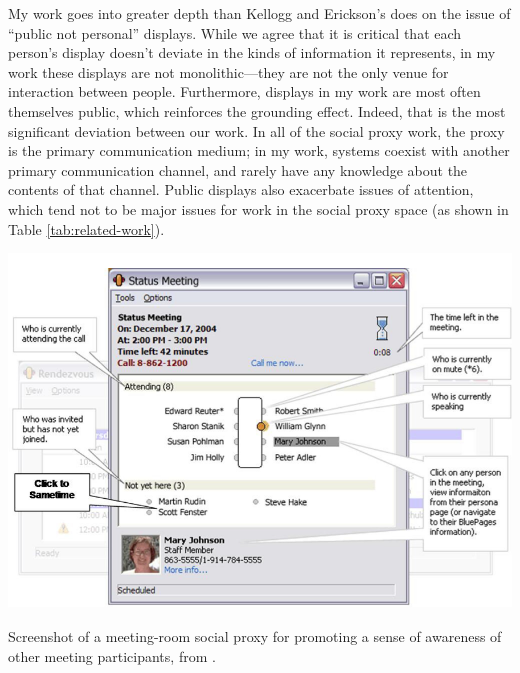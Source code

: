 My work goes into greater depth than Kellogg and Erickson's does on the issue of ``public not personal'' displays. While we agree that it is critical that each person's display doesn't deviate in the kinds of information it represents, in my work these displays are not monolithic---they are not the only venue for interaction between people. Furthermore, displays in my work are most often themselves public, which reinforces the grounding effect. Indeed, that is the most significant deviation between our work. In all of the social proxy work, the proxy is the primary communication medium; in my work, systems coexist with another primary communication channel, and rarely have any knowledge about the contents of that channel. Public displays also exacerbate issues of attention, which tend not to be major issues for work in the social proxy space (as shown in Table \ref{tab:related-work}). 


\begin{marginfigure}
	\includegraphics{figures/kellog_social_proxies.png}
	\caption{Screenshot of a meeting-room social proxy for promoting a sense of awareness of other meeting participants, from \citep{kellogg_leveraging_2006}.}
	\label{fig:social-proxies}
\end{marginfigure}


